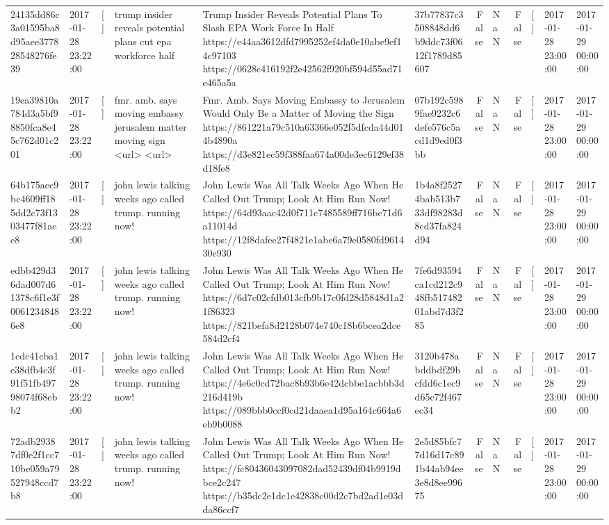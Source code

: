 \begin{tabular}{llllllrlrlll}
24135dd86c3a01595ba8d95aee377828548276fe39 & 2017-01-28 23:22:00 & [] & trump insider reveals potential plans cut epa workforce half & Trump Insider Reveals Potential Plans To Slash EPA Work Force In Half https://e44aa3612dfd7995252ef4da0e10abe9ef14c97103 https://0628c416192f2e42562f920bf594d55ad71e465a5a & 37b77837c3508848dd6b9ddc73f0612f1789d85607 & False & NaN & False & [] & 2017-01-28 23:00:00 & 2017-01-29 00:00:00 \\
19ea39810a784d3a5bf98850fca8e45c762d01c201 & 2017-01-28 23:22:00 & [] & fmr. amb. says moving embassy jerusalem matter moving sign <url> <url> & Fmr. Amb. Says Moving Embassy to Jerusalem Would Only Be a Matter of Moving the Sign https://861221a79c510a63366e052f5dfcda44d014b4890a https://d3e821ec59f388faa674a00de3ec6129ef38d18fe8 & 07b192c5989fae9232c6defe576c5acd1d9ed0f3bb & False & NaN & False & [] & 2017-01-28 23:00:00 & 2017-01-29 00:00:00 \\
64b175aec9bc4609ff185dd2c73f1303477f81aee8 & 2017-01-28 23:22:00 & [] & john lewis talking weeks ago called trump. running now! & John Lewis Was All Talk Weeks Ago When He Called Out Trump; Look At Him Run Now! https://64d93aac42d0f711c7485589ff716bc71d6a11014d https://12f8dafee27f4821e1abe6a79e0580fd961430e930 & 1b4a8f25274bab513b733df98283d8cd37fa824d94 & False & NaN & False & [] & 2017-01-28 23:00:00 & 2017-01-29 00:00:00 \\
edbb429d36dad007d61378c6f1e3f00612348486e8 & 2017-01-28 23:22:00 & [] & john lewis talking weeks ago called trump. running now! & John Lewis Was All Talk Weeks Ago When He Called Out Trump; Look At Him Run Now! https://6d7c02cfdb013cfb9b17c0fd28d5848d1a21f86323 https://821befa8d2128b074e740c18b6bcea2dce584d2cf4 & 7fe6d93594ca1cd212c948fb51748201abd7d3f285 & False & NaN & False & [] & 2017-01-28 23:00:00 & 2017-01-29 00:00:00 \\
1cdc41cba1e38dfb4c3f91f51fb49798074f68ebb2 & 2017-01-28 23:22:00 & [] & john lewis talking weeks ago called trump. running now! & John Lewis Was All Talk Weeks Ago When He Called Out Trump; Look At Him Run Now! https://4e6c0cd72bac8b93b6e42dcbbe1acbbb3d216d419b https://089bbb0ccf0cd21daaea1d95a164c664a6eb9b0088 & 3120b478abddbdf29bcfdd6c1ec9d65c72f467ec34 & False & NaN & False & [] & 2017-01-28 23:00:00 & 2017-01-29 00:00:00 \\
72adb29387df0e2f1cc710be059a79527948ccd7b8 & 2017-01-28 23:22:00 & [] & john lewis talking weeks ago called trump. running now! & John Lewis Was All Talk Weeks Ago When He Called Out Trump; Look At Him Run Now! https://fc80436043097082dad52439df04b9919dbce2c247 https://b35dc2e1dc1e42838c00d2c7bd2ad1e03dda86ccf7 & 2e5d85bfc77d16d17c891b44ab94ee3e8d8ee99675 & False & NaN & False & [] & 2017-01-28 23:00:00 & 2017-01-29 00:00:00 \\

\end{tabular}
